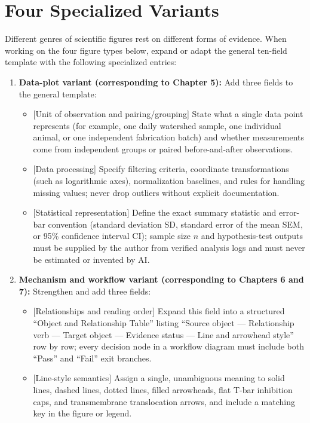 \section{Four Specialized Variants}

Different genres of scientific figures rest on different forms of evidence. When working on the four figure types below, expand or adapt the general ten-field template with the following specialized entries:

\begin{enumerate}
  \item \textbf{Data-plot variant (corresponding to Chapter 5):} Add three fields to the general template:
  \begin{itemize}
    \item {[Unit of observation and pairing/grouping]} State what a single data point represents (for example, one daily watershed sample, one individual animal, or one independent fabrication batch) and whether measurements come from independent groups or paired before-and-after observations.
    \item {[Data processing]} Specify filtering criteria, coordinate transformations (such as logarithmic axes), normalization baselines, and rules for handling missing values; never drop outliers without explicit documentation.
    \item {[Statistical representation]} Define the exact summary statistic and error-bar convention (standard deviation SD, standard error of the mean SEM, or 95\% confidence interval CI); sample size $n$ and hypothesis-test outputs must be supplied by the author from verified analysis logs and must never be estimated or invented by AI.
  \end{itemize}
  \item \textbf{Mechanism and workflow variant (corresponding to Chapters 6 and 7):} Strengthen and add three fields:
  \begin{itemize}
    \item {[Relationships and reading order]} Expand this field into a structured ``Object and Relationship Table'' listing ``Source object --- Relationship verb --- Target object --- Evidence status --- Line and arrowhead style'' row by row; every decision node in a workflow diagram must include both ``Pass'' and ``Fail'' exit branches.
    \item {[Line-style semantics]} Assign a single, unambiguous meaning to solid lines, dashed lines, dotted lines, filled arrowheads, flat T-bar inhibition caps, and transmembrane translocation arrows, and include a matching key in the figure or legend.

\end{itemize}
\end{enumerate}
